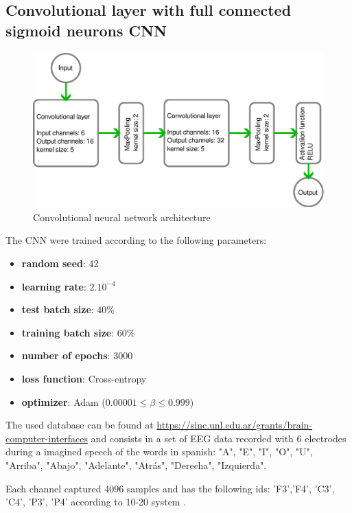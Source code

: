 		


	\subsection{Convolutional layer with full connected sigmoid neurons CNN}

	\begin{figure}[H]
		\centering
		\includegraphics[width=.7\linewidth]{images/architectureCNN}
		\caption{Convolutional neural network architecture}
		\label{fig:architecturecnn}
	\end{figure}

		\par The CNN were trained according to the following parameters:
		\begin{itemize}
			\item \textbf{random seed}: 42
			\item \textbf{learning rate}: $2.10^{-4}$
			\item \textbf{test batch size}: 40\%
			\item \textbf{training batch size}: 60\%
			\item \textbf{number of epochs}: 3000
			\item \textbf{loss function}: Cross-entropy
			\item \textbf{optimizer}: Adam ($0.00001 \leq \beta \leq 0.999$)
		\end{itemize}
		


	\par The used  database \cite{PRG16} can be found at \href{https://sinc.unl.edu.ar/grants/brain-computer-interfaces/}{https://sinc.unl.edu.ar/grants/brain-computer-interfaces} and consists in a set of EEG data recorded with 6 electrodes during a imagined speech of the words in spanish: 
	"A", "E", "I", "O", "U", "Arriba", "Abajo", "Adelante", "Atrás", "Derecha", "Izquierda".\newline
		
	\par Each channel captured 4096 samples and has the following ids: 'F3','F4', 'C3', 'C4', 'P3', 'P4' according to 10-20 system \cite{ScienceOpenVid:5960cfa8-7fde-441c-8592-35fdb9841499}.
